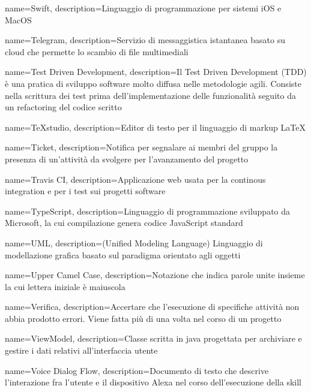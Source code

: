 {
	name={Swift},
	description={Linguaggio di programmazione per sistemi iOS e MacOS}
	{\pagebreak}
}

{
	name={Telegram},
	description={Servizio di messaggistica istantanea basato su cloud che permette lo scambio di file multimediali}
}

{
	name={Test Driven Development},
	description={Il Test Driven Development (TDD) è una pratica di sviluppo software molto diffusa nelle metodologie agili.
		Consiste nella scrittura dei test prima dell'implementazione delle funzionalità seguito da un refactoring del codice scritto}
}

{
	name={TeXstudio},
	description={Editor di testo per il linguaggio di markup \LaTeX}
}

{
	name={Ticket},
	description={Notifica per segnalare ai membri del gruppo la presenza di un’attività da svolgere per l’avanzamento del progetto}
}

{
	name={Travis CI},
	description={Applicazione web usata per la continous integration e per i test sui progetti software}
}

{
	name={TypeScript},
	description={Linguaggio di programmazione sviluppato da Microsoft, la cui compilazione genera codice JavaScript standard}
	{\pagebreak}
}

{
	name={UML},
	description={(Unified Modeling Language) Linguaggio di modellazione grafica basato sul paradigma orientato agli oggetti}
}

{
	name={Upper Camel Case},
	description={Notazione che indica parole unite insieme la cui lettera iniziale è maiuscola}
	{\pagebreak}
}

{
	name={Verifica},
	description={Accertare che l’esecuzione di specifiche attività non abbia prodotto errori. Viene fatta più di una volta nel corso di un progetto}
}

{
	name={ViewModel},
	description={Classe scritta in java progettata per archiviare e gestire i dati relativi all'interfaccia utente}
}

{
	name={Voice Dialog Flow},
	description={Documento di testo che descrive l'interazione fra l'utente e il dispositivo Alexa nel corso dell'esecuzione della skill}
	{\pagebreak}
}

